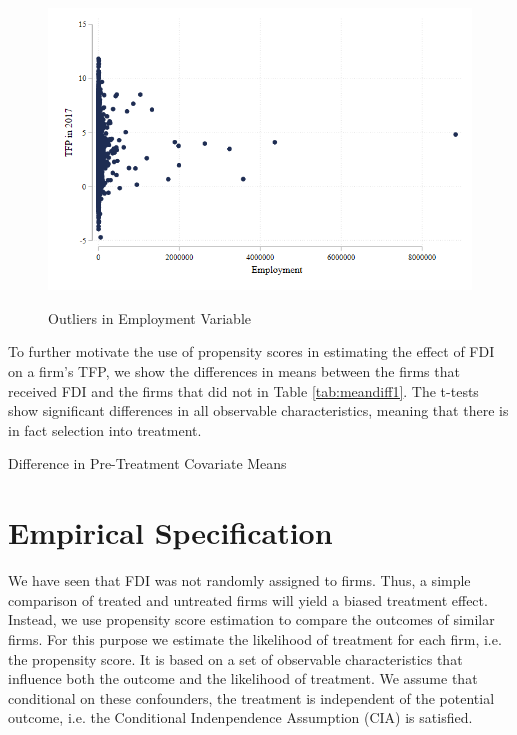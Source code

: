 \documentclass[a4paper,11pt]{scrartcl}
\begin{document}
\begin{figure}[h!]\centering
	\caption{Outliers in Employment Variable}
	\includegraphics[width=\textwidth]{emp15_outliers}
  	\label{fig:outliers}
\end{figure} 

To further motivate the use of propensity scores in estimating the effect of FDI on a firm's TFP, we show the differences in means between the firms that received FDI and the firms that did not in Table \ref{tab:meandiff1}. The t-tests show significant differences in all observable characteristics, meaning that there is in fact selection into treatment. %


\begin{table}[h!]
	\centering
	\caption{Difference in Pre-Treatment Covariate Means}
	\makebox[\textwidth]{
	}
	\label{tab:meandiff1}
\end{table}

\newpage
\section{Empirical Specification}

We have seen that FDI was not randomly assigned to firms. Thus, a simple comparison of treated and untreated firms will yield a biased treatment effect. Instead, we use propensity score estimation to compare the outcomes of similar firms. For this purpose we estimate the  likelihood of treatment for each firm, i.e. the propensity score. It is based on a set of observable characteristics that influence both the outcome and the likelihood of treatment. We assume that conditional on these confounders, the treatment is independent of the potential outcome, i.e. the Conditional Indenpendence Assumption (CIA) is satisfied. 
\end{document}
